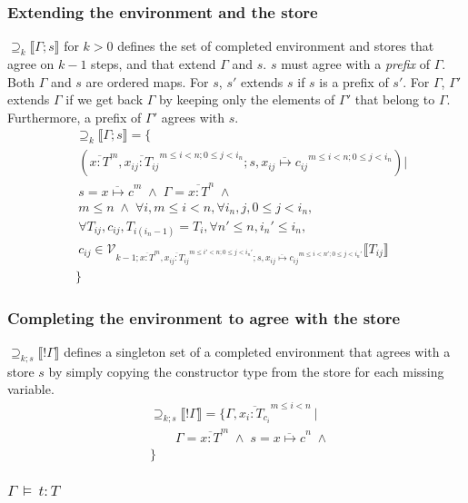 \documentclass[9pt]{sigplanconf}
\newcommand{\gap}{\quad\quad}
\newcommand{\seq}[1]{\overline{#1}}
\newcommand{\relv}[4]{\mathcal{V}_{#1;#2;#3}\llbracket#4\rrbracket}
\newcommand{\rels}[3]{\mathcal{\supseteq}_{#1}\llbracket#2;#3\rrbracket}
\newcommand{\relg}[3]{\mathcal{\supseteq}_{#1;#2}\llbracket!#3\rrbracket}
\newcommand{\andl}{\;\wedge\;}
\newcommand{\ds}{\,\vDash\,}
\begin{document}
\subsubsection{Extending the environment and the store}
$\rels k \Gamma s$ for $k > 0$ defines the set of completed
environment and stores that agree on $k-1$ steps, and that extend
$\Gamma$ and $s$. $s$ must agree with a {\it prefix} of $\Gamma$.
Both $\Gamma$ and $s$ are ordered maps. For $s$, $s'$ extends $s$ if
$s$ is a prefix of $s'$. For $\Gamma$, $\Gamma'$ extends $\Gamma$ if
we get back $\Gamma$ by keeping only the elements of $\Gamma'$ that
belong to $\Gamma$. Furthermore, a prefix of $\Gamma'$ agrees with
$s$.
\begin{align*}
&\rels k \Gamma s = \{\\
&\ (\seq{x : T}^m, \seq{x_{ij} : T_{ij}}^{m \leq i < n; 0 \leq j < i_n}; s, \seq{x_{ij} \mapsto c_{ij}}^{m \leq i < n; 0 \leq j < i_n}) |\\
&\ s = \seq{x \mapsto c}^m \andl \Gamma = \seq{x : T}^n \andl \\
&\ m\leq n \andl \forall i, m \leq i < n, \forall {i_n}, j, 0 \leq j < i_n,\\
&\ \forall T_{ij}, c_{ij}, T_{i{(i_n-1)}} = T_i, \forall n' \leq n, i_n' \leq i_n,\\
&\ c_{ij} \in \relv {k-1} {\seq{x : T}^m, \seq{x_{ij} : T_{ij}}^{m \leq i' < n; 0 \leq j < i_n'}} {s, \seq{x_{ij} \mapsto c_{ij}}^{m \leq i < n'; 0 \leq j < i_n'}} {T_{ij}}\\
&\}
\end{align*}

\subsubsection{Completing the environment to agree with the store}
$\relg k s \Gamma$ defines a singleton set of a completed environment
that agrees with a store $s$ by simply copying the constructor type
from the store for each missing variable.
\begin{align*}
&\relg k s \Gamma = \{ \Gamma, \seq{x_i : T_{c_i}}^{m \leq i < n} \ |\\
&\gap \Gamma = \seq{x : T}^m \andl s = \seq{x \mapsto c}^n \andl\\
&\}
\end{align*}

\subsubsection{$\Gamma \ds t : T$}
\end{document}
